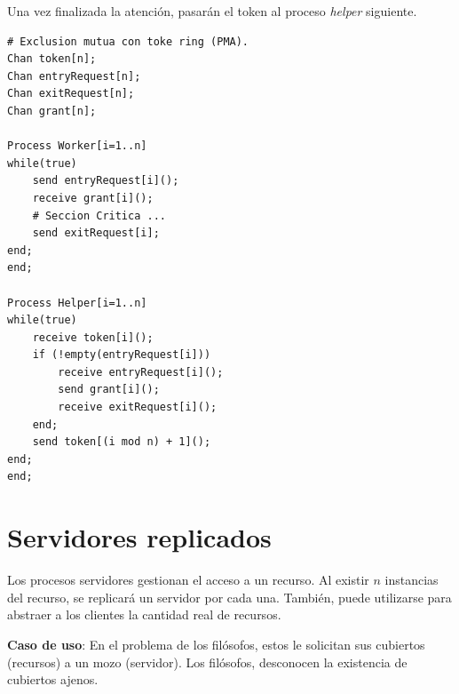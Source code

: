 \documentclass[a4paper, 10pt]{report}
\begin{document}
Una vez finalizada la atención, pasarán el token al proceso \emph{helper} siguiente.

\begin{lstlisting}[multicols=2]
# Exclusion mutua con toke ring (PMA).
Chan token[n];
Chan entryRequest[n];
Chan exitRequest[n];
Chan grant[n];

Process Worker[i=1..n]
while(true)
	send entryRequest[i]();
	receive grant[i]();
	# Seccion Critica ...
	send exitRequest[i];
end;
end;

Process Helper[i=1..n]
while(true)
	receive token[i]();
	if (!empty(entryRequest[i]))
		receive entryRequest[i]();
		send grant[i]();
		receive exitRequest[i]();
	end;
	send token[(i mod n) + 1]();
end;
end;
\end{lstlisting}

\section{Servidores replicados}

Los procesos servidores gestionan el acceso a un recurso. Al existir $n$ instancias del recurso, se replicará un servidor por cada una. También, puede utilizarse para abstraer a los clientes la cantidad real de recursos.

\textbf{Caso de uso}: En el problema de los filósofos, estos le solicitan sus cubiertos (recursos) a un mozo (servidor). Los filósofos, desconocen la existencia de cubiertos ajenos.
\end{document}
